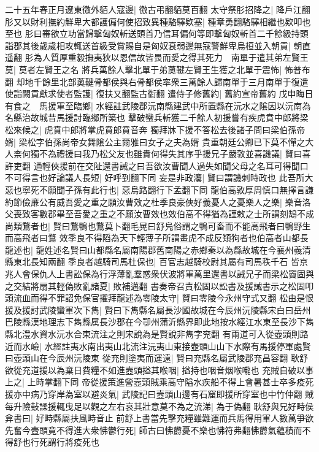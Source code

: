 二十五年春正月遼東徼外貊人寇邊|{
	徼古弔翻貊莫百翻}
太守祭肜招降之|{
	降戶江翻}
肜又以財利撫約鮮卑大都護偏何使招致異種駱驛欵塞|{
	種章勇翻駱驛相繼也欵叩也至也}
肜曰審欲立功當歸撃匈奴斬送頭首乃信耳偏何等即撃匈奴斬首二千餘級持頭詣郡其後歲歲相攻輒送首級受賞賜自是匈奴衰弱邊無寇警鮮卑烏桓並入朝貢|{
	朝直遥翻}
肜為人質厚重毅撫夷狄以恩信故皆畏而愛之得其死力　南單于遣其弟左賢王莫|{
	莫者左賢王之名}
將兵萬餘人擊北單于弟薁鞬左賢王生獲之北單于震怖|{
	怖普布翻}
却地千餘里北部薁鞬骨都侯與右骨都侯率衆三萬餘人歸南單于三月南單于復遣使詣闕貢獻求使者監護|{
	復扶又翻監古衘翻}
遣侍子修舊約|{
	舊約宣帝舊約}
戊申晦日有食之　馬援軍至臨鄉|{
	水經註武陵郡沅南縣建武中所置縣在沅水之隂因以沅南為名縣治故城昔馬援討臨鄉所築也}
擊破蠻兵斬獲二千餘人初援嘗有疾虎賁中郎將梁松來候之|{
	虎賁中郎將掌虎賁郎賁音奔}
獨拜牀下援不答松去後諸子問曰梁伯孫帝婿|{
	梁松字伯孫尚帝女舞隂公主爾雅曰女子之夫為婿}
貴重朝廷公卿已下莫不憚之大人柰何獨不為禮援曰我乃松父友也雖貴何得失其序乎援兄子嚴敦並喜譏議|{
	賢曰喜許吏翻}
通輕俠援前在交阯還書誡之曰吾欲汝曹聞人過失如聞父母之名耳可得聞口不可得言也好論議人長短|{
	好呼到翻下同}
妄是非政灋|{
	賢曰謂譏刺時政也}
此吾所大惡也寧死不願聞子孫有此行也|{
	惡烏路翻行下孟翻下同}
龍伯高敦厚周慎口無擇言謙約節儉亷公有威吾愛之重之願汝曹效之杜季良豪俠好義憂人之憂樂人之樂|{
	樂音洛}
父喪致客數郡畢至吾愛之重之不願汝曹效也效伯高不得猶為謹敕之士所謂刻鵠不成尚類鶩者也|{
	賢曰鶩鴨也鶩莫卜翻毛晃曰舒鳬俗謂之鴨可畜而不能高飛者曰鴨野生而高飛者曰鶩}
效季良不得䧟為天下輕薄子所謂畫虎不成反類狗者也伯高者山都長龍述也|{
	龍姓述名賢曰山都縣名屬南陽郡舊南陽之赤鄉秦以為縣故城在今襄州義清縣東北長知兩翻}
季良者越騎司馬杜保也|{
	百官志越騎校尉其屬有司馬秩千石}
皆京兆人會保仇人上書訟保為行浮薄亂羣惑衆伏波將軍萬里還書以誡兄子而梁松竇固與之交結將扇其輕偽敗亂諸夏|{
	敗補邁翻}
書奏帝召責松固以訟書及援誡書示之松固叩頭流血而得不罪詔免保官擢拜龍述為零陵太守|{
	賢曰零陵今永州守式又翻}
松由是恨援及援討武陵蠻軍次下雋|{
	賢曰下雋縣名屬長沙國故城在今辰州沅陵縣宋白曰岳州巴陵縣漢地理志下雋縣属長沙郡在今卾州蒲沂縣界即此地按水經江水東至長沙下雋縣北澧水資水沅水合東流注之則宋說為是賢說非雋字兖翻}
有兩道可入從壺頭則路近而水嶮|{
	水經註夷水南出夷山北流注沅夷山東接壺頭山山下水際有馬援停軍處賢曰壺頭山在今辰州沅陵東}
從充則塗夷而運遠|{
	賢曰充縣名屬武陵郡充昌容翻}
耿舒欲從充道援以為棄日費糧不如進壼頭搤其喉咽|{
	搤持也咽音烟喉嚨也}
充賊自破以事上之|{
	上時掌翻下同}
帝從援策進營壼頭賊乘高守隘水疾船不得上會暑甚士卒多疫死援亦中病乃穿岸為室以避炎氣|{
	武陵記曰壼頭山邊有石窟即援所穿室也中竹仲翻}
賊每升險鼔譟援輒曳足以觀之左右哀其壯意莫不為之流涕|{
	為于偽翻}
耿舒與兄好畤侯弇書曰|{
	好畤縣屬扶風畤音止}
前舒上書當先擊充糧雖難運而兵馬得用軍人數萬爭欲先奮今壼頭竟不得進大衆怫鬱行死|{
	師古曰怫欝憂不樂也怫符弗翻怫欝氣藴積而不得舒也行死謂行將疫死也}

